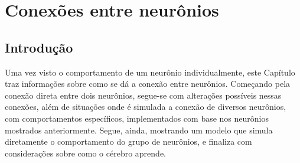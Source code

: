 \chapter{Conexões entre neurônios}\label{cap:conexoes}
\section{Introdução}\label{sec:conexoes_intro}
Uma vez visto o comportamento de um neurônio individualmente, este Capítulo traz informações sobre como se dá a conexão entre neurônios. Começando pela conexão direta entre dois neurônios, segue-se com alterações possíveis nessas conexões, além de situações onde é simulada a conexão de diversos neurônios, com comportamentos específicos, implementados com base nos neurônios mostrados anteriormente. Segue, ainda, mostrando um modelo que simula diretamente o comportamento do grupo de neurônios, e finaliza com considerações sobre como o cérebro aprende.

